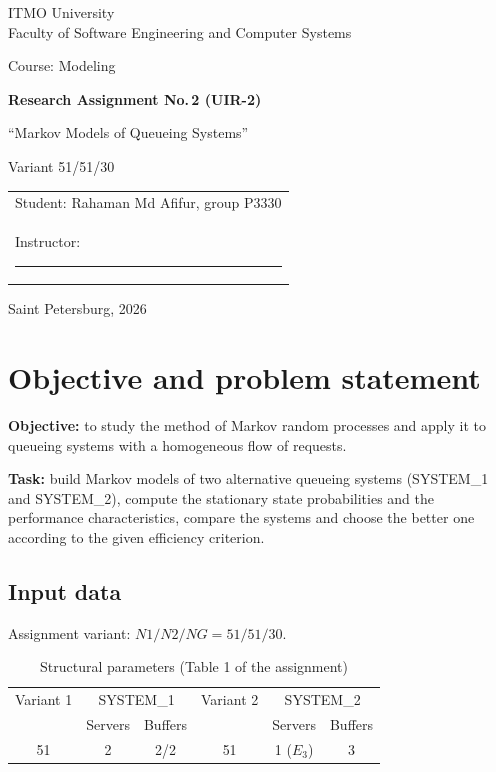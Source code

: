 \documentclass[12pt,a4paper]{article}
\begin{document}
\begin{titlepage}
\centering
{\large ITMO University\\Faculty of Software Engineering and Computer Systems\par}
\vspace{5cm}
{\Large Course: Modeling\par}
\vspace{1cm}
{\LARGE\bfseries Research Assignment No.\,2 (UIR-2)\par}
\vspace{0.4cm}
{\Large ``Markov Models of Queueing Systems''\par}
\vspace{0.6cm}
{\large Variant 51/51/30\par}
\vfill
\begin{flushright}
\begin{tabular}{l}
Student: Rahaman Md Afifur, group P3330\\[4mm]
Instructor: \rule{4.5cm}{0.4pt}\\
\end{tabular}
\end{flushright}
\vspace{2cm}
Saint Petersburg, 2026
\end{titlepage}

\tableofcontents
\newpage

\section{Objective and problem statement}
\textbf{Objective:} to study the method of Markov random processes and apply it to queueing
systems with a homogeneous flow of requests.

\textbf{Task:} build Markov models of two alternative queueing systems (SYSTEM\_1 and SYSTEM\_2),
compute the stationary state probabilities and the performance characteristics, compare the systems
and choose the better one according to the given efficiency criterion.

\subsection{Input data}
Assignment variant: $N1/N2/NG = 51/51/30$.

\begin{table}[H]
\centering
\caption{Structural parameters (Table 1 of the assignment)}
\begin{tabular}{cccccc}
\toprule
Variant 1 & \multicolumn{2}{c}{SYSTEM\_1} & Variant 2 & \multicolumn{2}{c}{SYSTEM\_2} \\
 & Servers & Buffers & & Servers & Buffers \\
\midrule
51 & 2 & 2/2 & 51 & 1 ($E_3$) & 3 \\
\bottomrule
\end{tabular}
\end{table}
\end{document}

